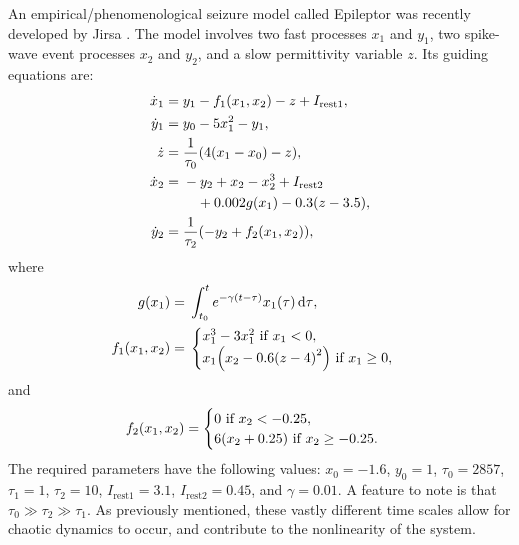 An empirical/phenomenological seizure model called Epileptor was recently developed by Jirsa .
The model involves two fast processes $x_{1}$ and $y_{1}$, two spike-wave event processes $x_{2}$ and $y_{2}$, and a slow permittivity variable $z$.
Its guiding equations are:
\begin{align}
  \label{eq:epileptor_x1}
  \dot{x}_{1}
  ={}&
    y_{1}
    -
    f_{1}(x_{1}, x_{2})
    -
    z
    +
    I_{\text{rest} 1}, \\
  \label{eq:epileptor_y1}
  \dot{y}_{1}
  ={}&
    y_{0}
    -
    5 x_{1}^{2}
    -
    y_{1}, \\
  \label{eq:epileptor_z}
  \dot{z}
  ={}&
    \frac{1}{\tau_{0}} \pqty{4 \pqty{x_{1} - x_{0}} - z}, \\
  \label{eq:epileptor_x2}
  \dot{x}_{2}
  ={}&
    -y_{2}
    +
    x_{2}
    -
    x_{2}^{3}
    +
    I_{\text{rest} 2} \\
    &{}\quad +
    0.002 g(x_{1})
    -
    0.3 \pqty{z - 3.5}, \\
  \label{eq:epileptor_y2}
  \dot{y}_{2}
  ={}&
    \frac{1}{\tau_{2}} \pqty{-y_{2} + f_{2}(x_{1}, x_{2})},
\end{align}
where
\begin{align}
  \label{eq:epileptor_g}
  g(x_{1})
  ={}&
    \int_{t_{0}}^{t}{e^{-\gamma \pqty{t - \tau}} x_{1}(\tau) \dd{\tau}}, \\
  \label{eq:epileptor_f1}
  f_{1}(x_{1}, x_{2})
  ={}&
    \begin{cases}
      x_{1}^{3} - 3 x_{1}^{2}
      \text{ if } x_{1} < 0, \\
      x_{1} \pqty{x_{2} - 0.6 \pqty{z - 4}^{2}}
      \text{ if }
      x_{1} \geq 0,
    \end{cases}
\end{align}
and
\begin{equation}
  \label{eq:epileptor_f2}
  f_{2}(x_{1}, x_{2})
  =
    \begin{cases}
      0
      \text{ if } x_{2} < -0.25, \\
      6 \pqty{x_{2} + 0.25}
      \text{ if } x_{2} \geq -0.25.
    \end{cases}
\end{equation}
The required parameters have the following values: $x_{0} = -1.6$, $y_{0} = 1$, $\tau_{0} = 2857$, $\tau_{1} = 1$, $\tau_{2} = 10$, $I_{\text{rest} 1} = 3.1$, $I_{\text{rest} 2} = 0.45$, and $\gamma = 0.01$.
A feature to note is that $\tau_{0} \gg \tau_{2} \gg \tau_{1}$.
As previously mentioned, these vastly different time scales allow for chaotic dynamics to occur, and contribute to the nonlinearity of the system.

